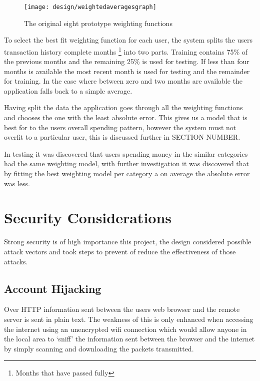 \begin{figure}[h]
    \centering
    \texttt{[image: design/weightedaveragesgraph]}
    \caption{The original eight prototype weighting functions}
    \label{fig:weightedaveragegraph}
\end{figure}

To select the best fit weighting function for each user, the system splits the users transaction history complete months \footnote{Months that have passed fully} into two parts. Training contains 75\% of the previous months and the remaining 25\% is used for testing.
%
If less than four months is available the most recent month is used for testing and the remainder for training. In the case where between zero and two months are available the application falls back to a simple average.

Having split the data the application goes through all the weighting functions and chooses the one with the least absolute error. This gives us a model that is best for to the users overall spending pattern, however the system must not overfit to a particular user, this is discussed further in SECTION NUMBER.

In testing it was discovered that users spending money in the similar categories had the same weighting model, with further investigation it was discovered that by fitting the best weighting model per category a on average the absolute error was less.


\section{Security Considerations}
Strong security is of high importance this project, the design considered possible attack vectors and took steps to prevent of reduce the effectiveness of those attacks.

\subsection{Account Hijacking}

Over HTTP information sent between the users web browser and the remote server is sent in plain text. The weakness of this is only enhanced when accessing the internet using an unencrypted wifi connection which would allow anyone in the local area to `sniff' the information sent between the browser and the internet by simply scanning and downloading the packets transmitted.

